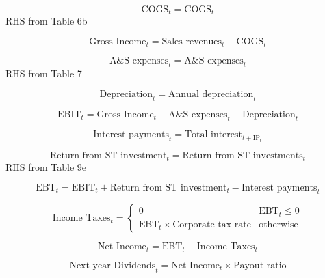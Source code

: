 \documentclass[12pt]{article}
\numberwithin{equation}{section}
\begin{document}
\begin{equation}
	\text{COGS}_{t} = \text{COGS}_{t}
\end{equation}
RHS from Table 6b

\begin{equation}
	\text{Gross Income}_{t} = \text{Sales revenues}_{t} - \text{COGS}_{t}
\end{equation}

\begin{equation}
	\text{A\&S expenses}_{t} = \text{A\&S expenses}_{t}
\end{equation}
RHS from Table 7

\begin{equation}
	\text{Depreciation}_{t} = \text{Annual depreciation}_{t}
\end{equation}

\begin{equation}
	\text{EBIT}_{t} = \text{Gross Income}_{t} -  \text{A\&S expenses}_{t} - \text{Depreciation}_{t}
\end{equation}

\begin{equation}
	\text{Interest payments}_{t} = \text{Total interest}_{t + \text{IP}_{t}}
\end{equation}

\begin{equation}
	\text{Return from ST investment}_{t} = \text{Return from ST investments}_{t}
\end{equation}
RHS from Table 9e

\begin{equation}
	\text{EBT}_{t} = \text{EBIT}_{t} + \text{Return from ST investment}_{t} - \text{Interest payments}_{t}
\end{equation}

\begin{equation}
	\text{Income Taxes}_{t} = 
	\begin{cases}
		0 & \text{EBT}_{t} \leq 0 \\
		\text{EBT}_{t} \times \text{Corporate tax rate} & \text{otherwise}
	\end{cases}
\end{equation}

\begin{equation}
	 \text{Net Income}_{t} = \text{EBT}_{t} - \text{Income Taxes}_{t}
\end{equation}

\begin{equation}
	 \text{Next year Dividends}_{t} = \text{Net Income}_{t} \times \text{Payout ratio}
\end{equation}
\end{document}
